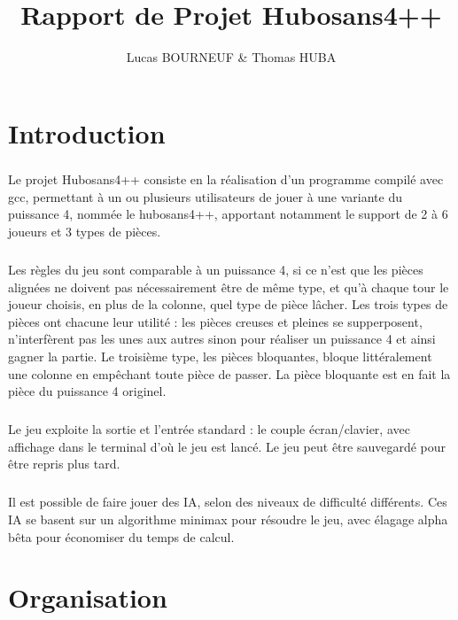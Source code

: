 \documentclass{report}
\title{Rapport de Projet Hubosans4++}
\author{Lucas BOURNEUF \& Thomas HUBA}
\begin{document}
\maketitle


\chapter*{Introduction}
\paragraph*{}
Le projet Hubosans4++ consiste en la réalisation d'un programme compilé avec gcc, permettant à un ou plusieurs utilisateurs de jouer à une variante du puissance 4, nommée le hubosans4++,
apportant notamment le support de 2 à 6 joueurs et 3 types de pièces. 
\paragraph*{}
Les règles du jeu sont comparable à un puissance 4, si ce n'est que les pièces alignées ne doivent pas nécessairement être de même type, et qu'à chaque tour le joueur choisis, 
en plus de la colonne, quel type de pièce lâcher. Les trois types de pièces ont chacune leur utilité : les pièces creuses et pleines se supperposent, 
n'interfèrent pas les unes aux autres sinon pour réaliser un puissance 4 et ainsi gagner la partie. 
Le troisième type, les pièces bloquantes, bloque littéralement une colonne en empêchant toute pièce de passer. La pièce bloquante est en fait la pièce du puissance 4 originel.
\paragraph*{}
Le jeu exploite la sortie et l'entrée standard : le couple écran/clavier, avec affichage dans le terminal d'où le jeu est lancé.
Le jeu peut être sauvegardé pour être repris plus tard.
\paragraph*{}
Il est possible de faire jouer des IA, selon des niveaux de difficulté différents. Ces IA se basent sur un algorithme minimax pour résoudre le jeu, avec élagage alpha bêta pour économiser
du temps de calcul.



\chapter{Organisation}
\end{document}
